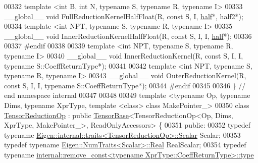 \begin{DoxyCode}
00332 \textcolor{keyword}{template} <\textcolor{keywordtype}{int} B, \textcolor{keywordtype}{int} N, \textcolor{keyword}{typename} S, \textcolor{keyword}{typename} R, \textcolor{keyword}{typename} I>
00333 \_\_global\_\_ \textcolor{keywordtype}{void} FullReductionKernelHalfFloat(R, \textcolor{keyword}{const} S, I, \hyperlink{struct_eigen_1_1half}{half}*, half2*);
00334 \textcolor{keyword}{template} <\textcolor{keywordtype}{int} NPT, \textcolor{keyword}{typename} S, \textcolor{keyword}{typename} R, \textcolor{keyword}{typename} I>
00335 \_\_global\_\_ \textcolor{keywordtype}{void} InnerReductionKernelHalfFloat(R, \textcolor{keyword}{const} S, I, I, \hyperlink{struct_eigen_1_1half}{half}*);
00336 
00337 \textcolor{preprocessor}{#endif}
00338 
00339 \textcolor{keyword}{template} <\textcolor{keywordtype}{int} NPT, \textcolor{keyword}{typename} S, \textcolor{keyword}{typename} R, \textcolor{keyword}{typename} I>
00340 \_\_global\_\_ \textcolor{keywordtype}{void} InnerReductionKernel(R, \textcolor{keyword}{const} S, I, I, \textcolor{keyword}{typename} S::CoeffReturnType*);
00341 
00342 \textcolor{keyword}{template} <\textcolor{keywordtype}{int} NPT, \textcolor{keyword}{typename} S, \textcolor{keyword}{typename} R, \textcolor{keyword}{typename} I>
00343 \_\_global\_\_ \textcolor{keywordtype}{void} OuterReductionKernel(R, \textcolor{keyword}{const} S, I, I, \textcolor{keyword}{typename} S::CoeffReturnType*);
00344 \textcolor{preprocessor}{#endif}
00345 
00346 \}  \textcolor{comment}{// end namespace internal}
00347 
00348 
00349 \textcolor{keyword}{template} <\textcolor{keyword}{typename} Op, \textcolor{keyword}{typename} Dims, \textcolor{keyword}{typename} XprType,  \textcolor{keyword}{template} <\textcolor{keyword}{class}> \textcolor{keyword}{class }MakePointer\_>
00350 \textcolor{keyword}{class }\hyperlink{class_eigen_1_1_tensor_reduction_op}{TensorReductionOp} : \textcolor{keyword}{public} \hyperlink{class_eigen_1_1_tensor_base}{TensorBase}<TensorReductionOp<Op, Dims, XprType,
       MakePointer\_>, ReadOnlyAccessors> \{
00351   \textcolor{keyword}{public}:
00352     \textcolor{keyword}{typedef} \textcolor{keyword}{typename} \hyperlink{struct_eigen_1_1internal_1_1traits}{Eigen::internal::traits<TensorReductionOp>::Scalar}
       Scalar;
00353     \textcolor{keyword}{typedef} \textcolor{keyword}{typename} \hyperlink{group___sparse_core___module}{Eigen::NumTraits<Scalar>::Real} RealScalar;
00354     \textcolor{keyword}{typedef} \textcolor{keyword}{typename} 
      \hyperlink{group___sparse_core___module}{internal::remove\_const<typename XprType::CoeffReturnType>::type}

\end{DoxyCode}
